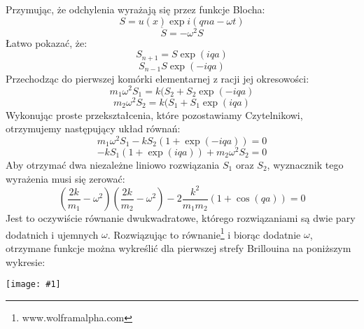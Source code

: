 \documentclass[11pt]{article}
\newcommand{\largepng}[1]{\begin{center}\texttt{[image: \#1]}\end{center}}
\begin{document}
Przymując, że odchylenia wyrażają się przez funkcje Blocha:
\[S = u(x)\exp{i(qna-\omega t)} \]
\[\ddot{S} = -\omega^2 S \]
Łatwo pokazać, że:
\[S_{n+1} = S \exp{(iqa)} \]
\[S_{n-1} S \exp{(-iqa)}\]
Przechodząc do pierwszej komórki elementarnej z racji jej okresowości:
\[ m_1 \omega^2 S_1 = k (S_2 + S_2 \exp{(-iqa)} \]
\[ m_2 \omega^2 S_2 = k (S_1 + S_1 \exp{(iqa)} \]
Wykonując proste przekształcenia, które pozostawiamy Czytelnikowi, otrzymujemy następujący układ równań:
\[ m_1 \omega^2 S_1 - k S_2 (1+\exp{(-iqa)}) = 0\]
\[ -k S_1 (1+\exp{(iqa)}) + m_2 \omega^2 S_2 = 0\]
Aby otrzymać dwa niezależne liniowo rozwiązania $S_1$ oraz $S_2$, wyznacznik tego wyrażenia musi się zerować:
\[(\frac{2k}{m_1}-\omega^2)(\frac{2k}{m_2}-\omega^2) - 2 \frac{k^2}{m_1 m_2} (1+\cos{(qa)}) = 0\]
Jest to oczywiście równanie dwukwadratowe, którego rozwiązaniami są dwie pary dodatnich i ujemnych $\omega$.
Rozwiązując to równanie\footnote{www.wolframalpha.com} i biorąc dodatnie $\omega$,
otrzymane funkcje można wykreślić dla pierwszej strefy Brillouina na poniższym wykresie:
\largepng{z3.png}
\end{document}
